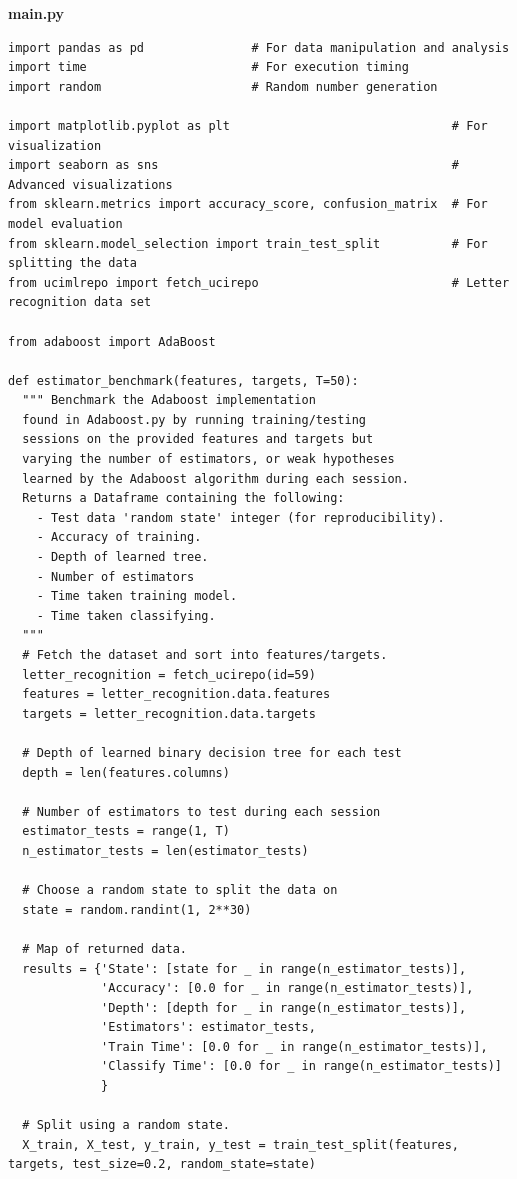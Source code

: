 \documentclass[a4paper]{article}
\begin{document}
\textbf{main.py}
\begin{lstlisting}[basicstyle= \scriptsize]
import pandas as pd               # For data manipulation and analysis
import time                       # For execution timing
import random                     # Random number generation

import matplotlib.pyplot as plt                               # For visualization
import seaborn as sns                                         # Advanced visualizations
from sklearn.metrics import accuracy_score, confusion_matrix  # For model evaluation
from sklearn.model_selection import train_test_split          # For splitting the data
from ucimlrepo import fetch_ucirepo                           # Letter recognition data set

from adaboost import AdaBoost

def estimator_benchmark(features, targets, T=50):
  """ Benchmark the Adaboost implementation
  found in Adaboost.py by running training/testing
  sessions on the provided features and targets but
  varying the number of estimators, or weak hypotheses
  learned by the Adaboost algorithm during each session.
  Returns a Dataframe containing the following:
    - Test data 'random state' integer (for reproducibility).
    - Accuracy of training.
    - Depth of learned tree.
    - Number of estimators
    - Time taken training model.
    - Time taken classifying.
  """
  # Fetch the dataset and sort into features/targets.
  letter_recognition = fetch_ucirepo(id=59) 
  features = letter_recognition.data.features
  targets = letter_recognition.data.targets
  
  # Depth of learned binary decision tree for each test
  depth = len(features.columns) 

  # Number of estimators to test during each session
  estimator_tests = range(1, T)
  n_estimator_tests = len(estimator_tests)

  # Choose a random state to split the data on
  state = random.randint(1, 2**30)

  # Map of returned data.
  results = {'State': [state for _ in range(n_estimator_tests)],
             'Accuracy': [0.0 for _ in range(n_estimator_tests)],
             'Depth': [depth for _ in range(n_estimator_tests)],
             'Estimators': estimator_tests,
             'Train Time': [0.0 for _ in range(n_estimator_tests)],
             'Classify Time': [0.0 for _ in range(n_estimator_tests)]
             }
  
  # Split using a random state.
  X_train, X_test, y_train, y_test = train_test_split(features, targets, test_size=0.2, random_state=state)


\end{lstlisting}
\end{document}

